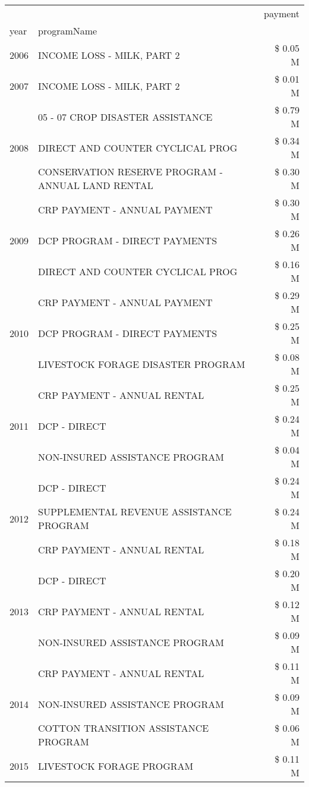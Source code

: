 \begin{tabular}{llr}
\toprule
 &  & payment \\
year & programName &  \\
\midrule
2006 & INCOME LOSS - MILK, PART 2 & \$ 0.05 M \\
\cline{1-3}
2007 & INCOME LOSS - MILK, PART 2 & \$ 0.01 M \\
\cline{1-3}
\multirow[t]{3}{*}{2008} & 05 - 07 CROP DISASTER ASSISTANCE & \$ 0.79 M \\
 & DIRECT AND COUNTER CYCLICAL PROG & \$ 0.34 M \\
 & CONSERVATION RESERVE PROGRAM - ANNUAL LAND RENTAL & \$ 0.30 M \\
\cline{1-3}
\multirow[t]{3}{*}{2009} & CRP PAYMENT - ANNUAL PAYMENT & \$ 0.30 M \\
 & DCP PROGRAM - DIRECT PAYMENTS & \$ 0.26 M \\
 & DIRECT AND COUNTER CYCLICAL PROG & \$ 0.16 M \\
\cline{1-3}
\multirow[t]{3}{*}{2010} & CRP PAYMENT - ANNUAL PAYMENT & \$ 0.29 M \\
 & DCP PROGRAM - DIRECT PAYMENTS & \$ 0.25 M \\
 & LIVESTOCK FORAGE DISASTER  PROGRAM & \$ 0.08 M \\
\cline{1-3}
\multirow[t]{3}{*}{2011} & CRP PAYMENT - ANNUAL RENTAL & \$ 0.25 M \\
 & DCP - DIRECT & \$ 0.24 M \\
 & NON-INSURED ASSISTANCE PROGRAM & \$ 0.04 M \\
\cline{1-3}
\multirow[t]{3}{*}{2012} & DCP - DIRECT & \$ 0.24 M \\
 & SUPPLEMENTAL REVENUE ASSISTANCE PROGRAM & \$ 0.24 M \\
 & CRP PAYMENT - ANNUAL RENTAL & \$ 0.18 M \\
\cline{1-3}
\multirow[t]{3}{*}{2013} & DCP - DIRECT & \$ 0.20 M \\
 & CRP PAYMENT - ANNUAL RENTAL & \$ 0.12 M \\
 & NON-INSURED ASSISTANCE PROGRAM & \$ 0.09 M \\
\cline{1-3}
\multirow[t]{3}{*}{2014} & CRP PAYMENT - ANNUAL RENTAL & \$ 0.11 M \\
 & NON-INSURED ASSISTANCE PROGRAM & \$ 0.09 M \\
 & COTTON TRANSITION ASSISTANCE PROGRAM & \$ 0.06 M \\
\cline{1-3}
\multirow[t]{3}{*}{2015} & LIVESTOCK FORAGE PROGRAM & \$ 0.11 M \\

\end{tabular}
